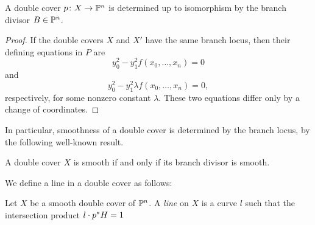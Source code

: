 \begin{proposition}
  A double cover $p \from X \to \P^n$ is determined up to isomorphism by the branch divisor $B \in \P^n$.
\end{proposition}
\begin{proof}
  If the double covers $X$ and $X'$ have the same branch locus, then their defining equations in $P$ are
\[y_0^2 - y_1^2f(x_0,\dots,x_n) = 0\]
and
\[y_0^2 - y_1^2 \lambda f(x_0,\dots,x_n) = 0, \]
respectively, for some nonzero constant $\lambda$. %
These two equations differ only by a change of coordinates.
\end{proof}

In particular, smoothness of a double cover is determined by the branch locus, by the following well-known result.
\begin{proposition}
  \label{prop:SmoothnessByBranchDivisor}
  A double cover $X$ is smooth if and only if its branch divisor is smooth.
\end{proposition}


We define a line in a double cover as follows:
\begin{definition}
  \label{def:LineOnDoubleCover}
  Let $X$ be a smooth double cover of $\P^n$. A \emph{line} on $X$ is a curve $l$ such that the intersection product $l \insec p^*H = 1$
\end{definition}

